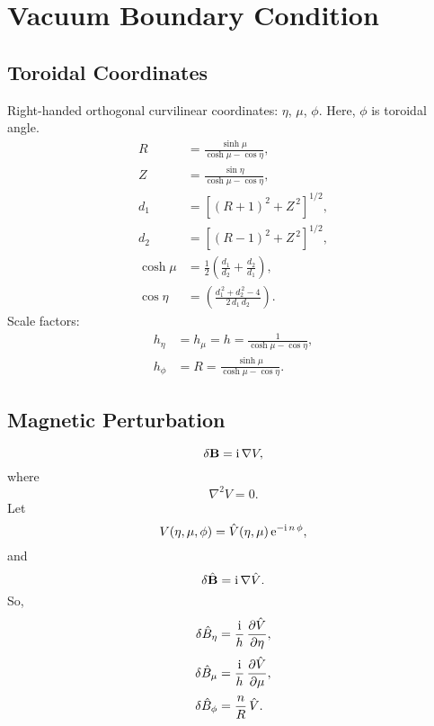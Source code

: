 \documentclass[12pt,prb,aps,notitlepage]{revtex4-1}
\begin{document}
\section{Vacuum Boundary Condition}
\subsection{Toroidal Coordinates}
Right-handed orthogonal curvilinear coordinates: $\eta$, $\mu$, $\phi$. Here, $\phi$ is toroidal angle.
\begin{align}
R &= \frac{\sinh\mu}{\cosh\mu-\cos\eta},\\[0.5ex]
Z &= \frac{\sin\eta}{\cosh\mu-\cos\eta},\\[0.5ex]
d_1 &= [(R+1)^2+Z^{\,2}]^{1/2},\\[0.5ex]
d_2&= [(R-1)^2+Z^{\,2}]^{1/2},\\[0.5ex]
\cosh\mu &= \frac{1}{2}\left(\frac{d_1}{d_2}+\frac{d_2}{d_1}\right),\\[0.5ex]
\cos\eta &= \left(\frac{d_1^{\,2} + d_2^{\,2}-4}{2\,d_1\,d_2}\right).
\end{align}
Scale factors:
\begin{align}
h_\eta &= h_\mu = h = \frac{1}{\cosh\mu-\cos\eta},\\[0.5ex]
h_\phi &= R = \frac{\sinh\mu}{\cosh\mu-\cos\eta}.
\end{align}

\subsection{Magnetic Perturbation}
\begin{equation}
\delta{\bf B} = {\rm i}\,\nabla V,
\end{equation}
where
\begin{equation}
\nabla^2 V = 0.
\end{equation}
Let
\begin{equation}
V(\eta,\mu,\phi) = \hat{V}(\eta,\mu)\,{\rm e}^{-{\rm i}\,n\,\phi},
\end{equation}
and
\begin{equation}
\delta\hat{\bf B} = {\rm i }\,\nabla\hat{V}.
\end{equation}
So,
\begin{align}
\delta\hat{B}_\eta &= \frac{{\rm i}}{h}\,\frac{\partial\hat{V}}{\partial\eta},\\[0.5ex]
\delta\hat{B}_\mu&= \frac{{\rm i}}{h}\,\frac{\partial\hat{V}}{\partial\mu},\\[0.5ex]
\delta\hat{B}_\phi &= \frac{n}{R}\,\hat{V}.
\end{align}
\end{document}
